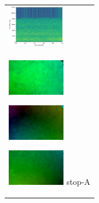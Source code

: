 \begin{figure}[htbp]
\begin{tabular}{l}
\begin{minipage}{0.165\hsize}
\begin{center}
        \end{center}
      \end{minipage}
      \begin{minipage}{0.165\hsize}
        \begin{center}
          \includegraphics[clip, width=2.5cm]{./Figures/sound_stop.eps}
        \end{center}
      \end{minipage}
\\  %
      \begin{minipage}{0.165\hsize}
        \begin{center}
          \includegraphics[clip, width=2.5cm]{./Figures/optic_stop1-1.eps}
          \hspace{0.3cm} { }
        \end{center}
      \end{minipage}
      \begin{minipage}{0.165\hsize}
        \begin{center}
          \includegraphics[clip, width=2.5cm]{./Figures/optic_stop1-2.eps}
          \hspace{0.0cm} { }
        \end{center}
      \end{minipage}
      \begin{minipage}{0.165\hsize}
        \begin{center}
          \includegraphics[clip, width=2.5cm]{./Figures/optic_stop1-3.eps}
          \hspace{2.0cm} {stop-A}
        \end{center}
      \end{minipage}

\end{tabular}
\end{figure}

